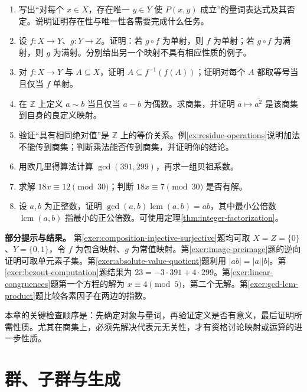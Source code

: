 \documentclass[UTF8,12pt,a4paper,fontset=fandol]{ctexbook}
\begin{document}
\begin{enumerate}
  \item\label{exer:quantifier-uniqueness} 写出“对每个 $x\in X$，存在唯一 $y\in Y$ 使 $P(x,y)$ 成立”的量词表达式及其否定。说明证明存在性与唯一性各需要完成什么任务。
  \item\label{exer:composition-injective-surjective} 设 $f:X\to Y$、$g:Y\to Z$。证明：若 $g\circ f$ 为单射，则 $f$ 为单射；若 $g\circ f$ 为满射，则 $g$ 为满射。分别给出另一个映射不具有相应性质的例子。
  \item\label{exer:image-preimage} 对 $f:X\to Y$ 与 $A\subseteq X$，证明 $A\subseteq f^{-1}(f(A))$；证明对每个 $A$ 都取等号当且仅当 $f$ 单射。
  \item\label{exer:quotient-square-map} 在 $\mathbb Z$ 上定义 $a\sim b$ 当且仅当 $a-b$ 为偶数。求商集，并证明 $\overline a\mapsto\overline{a^2}$ 是该商集到自身的良定义映射。
  \item\label{exer:absolute-value-quotient} 验证“具有相同绝对值”是 $\mathbb Z$ 上的等价关系。例\ref{ex:residue-operations}说明加法不能传到商集；判断乘法能否传到商集，并证明你的结论。
  \item\label{exer:bezout-computation} 用欧几里得算法计算 $\gcd(391,299)$，再求一组贝祖系数。
  \item\label{exer:linear-congruences} 求解 $18x\equiv12\pmod{30}$；判断 $18x\equiv7\pmod{30}$ 是否有解。
  \item\label{exer:gcd-lcm-product} 设 $a,b$ 为正整数，证明 $\gcd(a,b)\operatorname{lcm}(a,b)=ab$，其中最小公倍数 $\operatorname{lcm}(a,b)$ 指最小的正公倍数。可使用定理\ref{thm:integer-factorization}。
\end{enumerate}

\textbf{部分提示与结果。} 第\ref{exer:composition-injective-surjective}题均可取 $X=Z=\{0\}$、$Y=\{0,1\}$，令 $f$ 为包含映射、$g$ 为常值映射。第\ref{exer:image-preimage}题的逆向证明可取单元素子集。第\ref{exer:absolute-value-quotient}题利用 $|ab|=|a||b|$。第\ref{exer:bezout-computation}题结果为 $23=-3\cdot391+4\cdot299$。第\ref{exer:linear-congruences}题第一个方程的解为 $x\equiv4\pmod5$，第二个无解。第\ref{exer:gcd-lcm-product}题比较各素因子在两边的指数。

本章的关键检查顺序是：先确定对象与量词，再验证定义是否有意义，最后证明所需性质。尤其在商集上，必须先解决代表元无关性，才有资格讨论映射或运算的进一步性质。

\chapter{群、子群与生成}\label{ch:groups}
\end{document}
